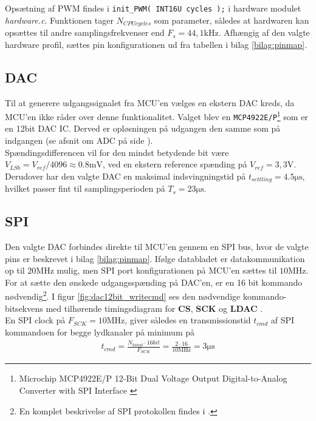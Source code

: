 Opsætning af PWM findes i \texttt{init\_PWM( INT16U cycles );} i hardware modulet \textit{hardware.c}. 
Funktionen tager $N_{CPU cycles}$ som parameter, således at hardwaren kan opsættes til andre samplingsfrekvenser end $F_s = 44,1\si{\kilo\hertz}$.
Afhængig af den valgte hardware profil, sættes pin konfigurationen ud fra tabellen i bilag \ref{bilag:pinmap}.  

\FloatBlock

\subsection{DAC}
Til at generere udgangssignalet fra MCU'en vælges en ekstern DAC kreds, da MCU'en ikke råder over denne funktionalitet.
Valget blev en \texttt{MCP4922E/P}\footnote{Microchip MCP4922E/P 12-Bit Dual Voltage Output Digital-to-Analog Converter with SPI Interface \cite{mcp4922} } som er en 12bit DAC IC.
Derved er opløsningen på udgangen den samme som på indgangen (se afsnit om ADC på side \pageref{subsec:adc}).\\

Spændingsdifferencen vil for den mindst betydende bit være $ V_{LSb} = V_{ref} / 4096 \approx \num{0,8}\si{\milli\volt} $, ved en ekstern reference spænding på $V_{ref} = 3,3\si{\volt}$.
Derudover har den valgte DAC en maksimal indsvingningstid på $t_{settling} = \num{4.5}\si{\micro\second}$, hvilket passer fint til samplingsperioden på $T_s = 23\si{\micro\second}$. 

\subsection{SPI}
Den valgte DAC forbindes direkte til MCU'en gennem en SPI bus, hvor de valgte pins er beskrevet i bilag \ref{bilag:pinmap}.
Ifølge databladet er datakommunikation op til $20\si{\mega\hertz}$ mulig, men SPI port konfigurationen på MCU'en sættes til $10\si{\mega\hertz}$.
For at sætte den ønskede udgangsspænding på DAC'en, er en 16 bit kommando nødvendig\footnote{En komplet beskrivelse af SPI protokollen findes i \cite[s. 23]{mcp4922}.}. 
I figur \ref{fig:dac12bit_writecmd} ses den nødvendige kommando-bitsekvens med tilhørende timingsdiagram for \textbf{CS}, \textbf{SCK} og \textbf{LDAC}  .\\

En SPI clock på $F_{SCK} = 10\si{\mega\hertz}$, giver således en transmissionstid $t_{cmd}$ af SPI kommandoen for begge lydkanaler på minimum på 
\begin{align}
	t_{cmd} = \frac{N_{kanal} \cdot 16bit}{F_{SCK}} = \frac{2 \cdot 16}{10\si{\mega\hertz}} = 3\si{\micro\second}
\end{align}

